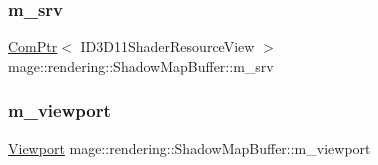 \subsubsection{\texorpdfstring{m\+\_\+srv}{m\_srv}}
{\footnotesize\ttfamily \hyperlink{namespacemage_ae74f374780900893caa5555d1031fd79}{Com\+Ptr}$<$ I\+D3\+D11\+Shader\+Resource\+View $>$ mage\+::rendering\+::\+Shadow\+Map\+Buffer\+::m\+\_\+srv\hspace{0.3cm}{\ttfamily [private]}}

\hypertarget{classmage_1_1rendering_1_1_shadow_map_buffer_a4a14db50178175af15272e7ccd81b758}{}\label{classmage_1_1rendering_1_1_shadow_map_buffer_a4a14db50178175af15272e7ccd81b758} 
\subsubsection{\texorpdfstring{m\+\_\+viewport}{m\_viewport}}
{\footnotesize\ttfamily \hyperlink{classmage_1_1rendering_1_1_viewport}{Viewport} mage\+::rendering\+::\+Shadow\+Map\+Buffer\+::m\+\_\+viewport\hspace{0.3cm}{\ttfamily [private]}}

